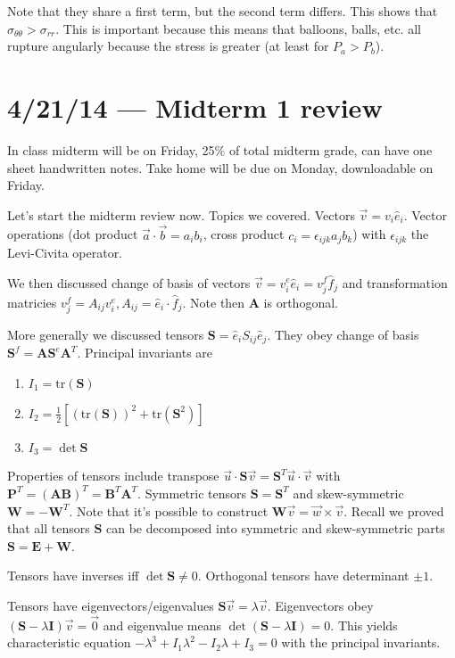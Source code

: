 \documentclass[10pt]{report}
\newcommand{\tr}[0]{\mathrm{tr} }
\begin{document}
Note that they share a first term, but the second term differs. This shows that $\sigma_{\theta\theta} > \sigma_{rr}$. This is important because this means that balloons, balls, etc. all rupture angularly because the stress is greater (at least for $P_a > P_b$). 
\chapter{4/21/14 --- Midterm 1 review}

In class midterm will be on Friday, 25\% of total midterm grade, can have one sheet handwritten notes. Take home will be due on Monday, downloadable on Friday. 

Let's start the midterm review now. Topics we covered. Vectors $\vec{v} = v_i\hat{e}_i$. Vector operations (dot product $\vec{a}\cdot \vec{b} = a_ib_i$, cross product $c_i = \epsilon_{ijk}a_jb_k$) with $\epsilon_{ijk}$ the Levi-Civita operator.

We then discussed change of basis of vectors $\vec{v} = v_i^e\hat{e}_i = v_j^f\hat{f}_j$ and transformation matricies $v_j^f = A_{ij}v_i^e, A_{ij} = \hat{e}_i\cdot\hat{f}_j$. Note then $\mathbf{A}$ is orthogonal.

More generally we discussed tensors $\mathbf{S} = \hat{e}_i S_{ij}\hat{e}_j$. They obey change of basis $\mathbf{S}^f = \mathbf{A}\mathbf{S}^e\mathbf{A}^T$. Principal invariants are
\begin{enumerate}
    \item $I_1 = \tr(\mathbf{S})$
    \item $I_2 = \frac{1}{2}\left[ (\tr(\mathbf{S}))^2 + \tr(\mathbf{S}^2) \right]$
    \item $I_3 = \det \mathbf{S}$
\end{enumerate}

Properties of tensors include transpose $\vec{u} \cdot \mathbf{S}\vec{v} = \mathbf{S}^T\vec{u}\cdot \vec{v}$ with $\mathbf{P}^T = (\mathbf{A}\mathbf{B})^T = \mathbf{B}^T\mathbf{A}^T$. Symmetric tensors $\mathbf{S} = \mathbf{S}^T$ and skew-symmetric $\mathbf{W} = -\mathbf{W}^T$. Note that it's possible to construct $\mathbf{W}\vec{v} = \vec{w}\times \vec{v}$. Recall we proved that all tensors $\mathbf{S}$ can be decomposed into symmetric and skew-symmetric parts $\mathbf{S} = \mathbf{E} + \mathbf{W}$. 

Tensors have inverses iff $\det \mathbf{S} \neq 0$. Orthogonal tensors have determinant $\pm 1$.

Tensors have eigenvectors/eigenvalues $\mathbf{S}\vec{v} = \lambda \vec{v}$. Eigenvectors obey $(\mathbf{S} - \lambda \mathbf{I}) \vec{v} = \vec{0}$ and eigenvalue means $\det(\mathbf{S} - \lambda \mathbf{I}) = 0$. This yields characteristic equation $-\lambda^3 + I_1\lambda^2 - I_2\lambda + I_3 = 0$ with the principal invariants.
\end{document}
